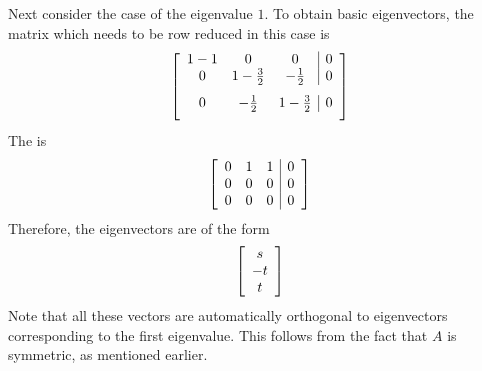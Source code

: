 \begin{solution}
Next consider the case of the eigenvalue $1$. To obtain basic eigenvectors, the matrix which needs to be
row reduced in this case is 
\begin{equation*}
\leftB 
\begin{array}{ccc|c}
1-1 & 0 & 0 & 0 \\ 
0 & 1-\vspace{0.05in}\frac{3}{2} & -\vspace{0.05in}\frac{1}{2} & 0 \\ 
0 & -\vspace{0.05in}\frac{1}{2} & 1-\vspace{0.05in}\frac{3}{2} & 0
\end{array}
\rightB
\end{equation*}
The {\rref} is 
\begin{equation*}
\left[ 
\begin{array}{rrr|r}
0 & 1 & 1 & 0 \\ 
0 & 0 & 0 & 0 \\ 
0 & 0 & 0 & 0
\end{array}
\right] 
\end{equation*}
Therefore, the eigenvectors are of the form 
\begin{equation*}
\left[ 
\begin{array}{c}
s \\ 
-t \\ 
t
\end{array}
\right] 
\end{equation*}
Note that all these vectors are automatically orthogonal to
eigenvectors corresponding to the first eigenvalue. This follows from the fact that $A$
is symmetric, as mentioned earlier.


\end{solution}
